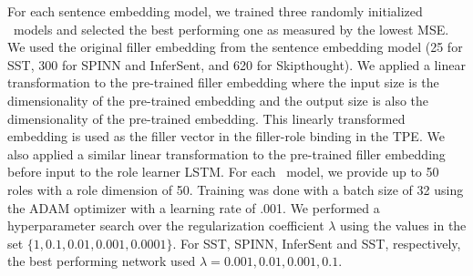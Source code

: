 For each sentence embedding model, we trained three randomly initialized \RLN\ models and selected the best performing one as measured by the lowest MSE. We used the original filler embedding from the sentence embedding model (25 for SST, 300 for SPINN and InferSent, and 620 for Skipthought). We applied a linear transformation to the pre-trained filler embedding where the input size is the dimensionality of the pre-trained embedding and the output size is also the dimensionality of the pre-trained embedding. This linearly transformed embedding is used as the filler vector in the filler-role binding in the TPE. We also applied a similar linear transformation to the pre-trained filler embedding before input to the role learner LSTM. For each \RLN\ model, we provide up to 50 roles with a role dimension of 50. Training was done with a batch size of 32 using the ADAM optimizer with a learning rate of .001. We performed a hyperparameter search over the regularization coefficient $\lambda$ using the values in the set $\{1, 0.1, 0.01, 0.001, 0.0001 \}$. For SST, SPINN, InferSent and SST, respectively, the best performing network used $\lambda=0.001, 0.01, 0.001, 0.1$. 
